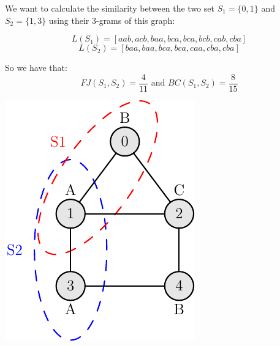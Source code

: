 			\begin{minipage}{0.65\textwidth}\raggedright
			\begin{esempio}
			\end{esempio}
		
			We want to calculate the similarity between the two set $S_{1} = \{0,1\}$ and $S_{2} = \{1, 3\}$ using their $3$-grams of this graph:
		
	\begin{equation*}
L(S_{1}) = [aab, acb, baa, bca, bca, bcb, cab, cba]
\end{equation*}
\begin{equation*}
L(S_{2}) = [baa, baa, bca, bca, caa, cba, cba]
\end{equation*}


So we have that:
\begin{equation*}
FJ(S_{1}, S_{2}) = \frac{4}{11} \text{  and  } BC(S_{1}, S_{2}) = \frac{8}{15}
\end{equation*}
			
\end{minipage}
\begin{minipage}{0.30\textwidth}
	\includegraphics[width=\linewidth]{figure/figure-2-1}
\end{minipage}
	

